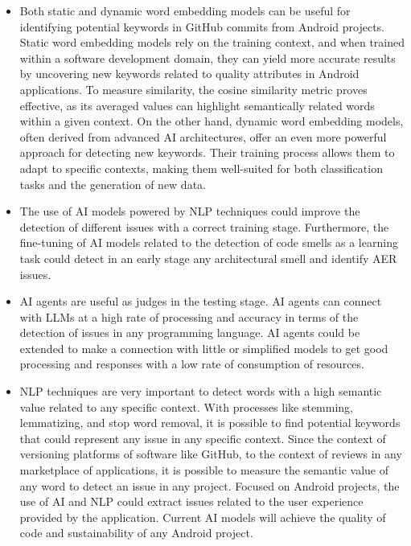 \begin{itemize}
	\item Both static and dynamic word embedding models can be useful for identifying potential keywords in GitHub commits from Android projects. Static word embedding models rely on the training context, and when trained within a software development domain, they can yield more accurate results by uncovering new keywords related to quality attributes in Android applications. To measure similarity, the cosine similarity metric proves effective, as its averaged values can highlight semantically related words within a given context. On the other hand, dynamic word embedding models, often derived from advanced AI architectures, offer an even more powerful approach for detecting new keywords. Their training process allows them to adapt to specific contexts, making them well-suited for both classification tasks and the generation of new data.
	
	\item The use of AI models powered by NLP techniques could improve the detection of different issues with a correct training stage. Furthermore, the fine-tuning of AI models related to the detection of code smells as a learning task could detect in an early stage any architectural smell and identify AER issues.
	
	\item AI agents are useful as judges in the testing stage. AI agents can connect with LLMs at a high rate of processing and accuracy in terms of the detection of issues in any programming language. AI agents could be extended to make a connection with little or simplified models to get good processing and responses with a low rate of consumption of resources.
	
	\item NLP techniques are very important to detect words with a high semantic value related to any specific context. With processes like stemming, lemmatizing, and stop word removal, it is possible to find potential keywords that could represent any issue in any specific context. Since the context of versioning platforms of software like GitHub, to the context of reviews in any marketplace of applications, it is possible to measure the semantic value of any word to detect an issue in any project. Focused on Android projects, the use of AI and NLP could extract issues related to the user experience provided by the application. Current AI models will achieve the quality of code and sustainability of any Android project.

\end{itemize}


